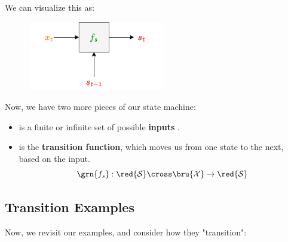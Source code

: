         We can visualize this as:
    
        \begin{figure}[H]
            \centering
            \includegraphics[width=60mm,scale=0.4]{images/rnn_images/transition_diagram.png}
        \end{figure}

        Now, we have two more pieces of our state machine:
        
        \begin{itemize}
            \item {} is a finite or infinite set of possible \textbf{inputs} .
            \item {} is the \textbf{transition function}, which moves us from one state to the next, based on the input.
                \begin{equation}
                    \grn{f_s}: \red{\mathcal{S}} \cross \bru{\mathcal{X}} 
                    \rightarrow \red{\mathcal{S}}
                \end{equation}
        \end{itemize}



    \phantom{}

    \subsection{Transition Examples}
        
        Now, we revisit our examples, and consider how they "transition":
        
